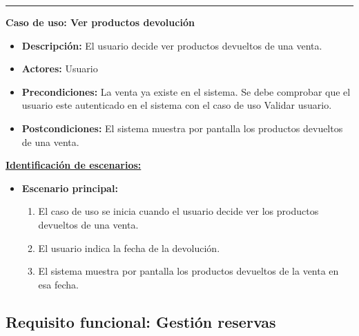 \smallskip
\hrule height 1pt
\smallskip
\textbf{Caso de uso: Ver productos devolución}
\begin{itemize}\renewcommand{\labelitemi}{$\cdot$}
 \item \textbf{Descripción:} El usuario decide ver productos devueltos de una venta.
  \item \textbf{Actores:} Usuario
  \item \textbf{Precondiciones:} La venta ya existe en el sistema. Se debe comprobar que el usuario este autenticado en el sistema con el caso de uso Validar usuario.
  \item \textbf{Postcondiciones:} El sistema muestra por pantalla los productos devueltos de una venta.
\end{itemize}
\underline{\textbf{Identificación de escenarios:}}
\begin{itemize}\renewcommand{\labelitemi}{$\circ$}
 \item \textbf{Escenario principal:}
         \begin{enumerate}
          \item El caso de uso se inicia cuando el usuario decide ver los productos devueltos de una venta.
          \item El usuario indica la fecha de la devolución.
	  \item El sistema muestra por pantalla los productos devueltos de la venta en esa fecha.
         \end{enumerate}
\end{itemize}

\subsection{Requisito funcional: Gestión reservas}

